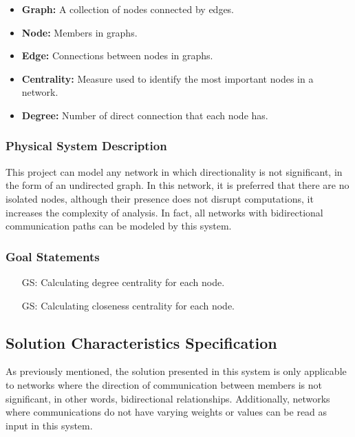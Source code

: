 \documentclass[12pt]{article}
\newcounter{goalnum} %
\begin{document}
\begin{itemize}
\item \textbf{Graph:}  A collection of nodes connected by edges.

\item \textbf{Node:} Members in graphs.
\item \textbf{Edge:} Connections between nodes in graphs.

\item \textbf{Centrality:} Measure used to identify the most important nodes in a network.
\item \textbf{Degree:}  Number of direct connection that each node has.


\end{itemize}

\subsubsection{Physical System Description} \label{sec_phySystDescrip}

This project can model any network in which directionality is not significant, in the form of an undirected graph. In this network, it is preferred that there are no isolated nodes, although their presence does not disrupt computations, it increases the complexity of analysis. In fact, all networks with bidirectional communication paths can be modeled by this system.


\subsubsection{Goal Statements}


\begin{itemize}

\item[GS\refstepcounter{goalnum}\thegoalnum \label{g_degree}:] 
Calculating degree centrality for each node.
\item[GS\refstepcounter{goalnum}\thegoalnum \label{g_closeness}:]
Calculating closeness centrality for each node.

\end{itemize}

\subsection{Solution Characteristics Specification}

As previously mentioned, the solution presented in this system is only applicable to networks where the direction of communication between members is not significant, in other words, bidirectional relationships. Additionally, networks where communications do not have varying weights or values can be read as input in this system.
\end{document}
